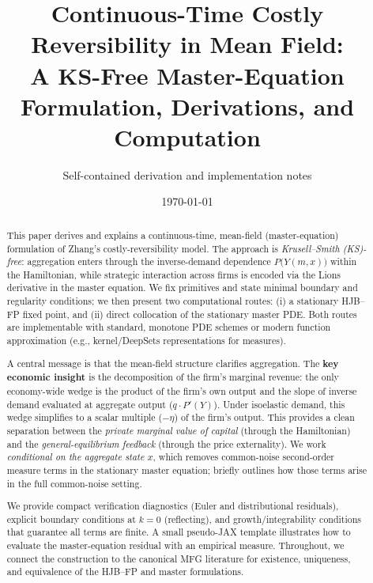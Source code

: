 ﻿\documentclass[11pt,letterpaper,oneside]{article}
\title{\vspace{-1.5em}Continuous-Time Costly Reversibility in Mean Field:\\
A KS-Free Master-Equation Formulation, Derivations, and Computation}
\author{%
\small Self-contained derivation and implementation notes
}
\date{\small \today}
\numberwithin{equation}{section}
\newcommand{\ac}[1]{{\mdseries\textsc{#1}}}
\newcommand{\1}{\mathbf{1}}
\begin{document}
\maketitle

\begin{abstract}
\noindent
This paper derives and explains a continuous-time, mean-field (master-equation) formulation of Zhang's costly-reversibility model. The approach is \emph{Krusell--Smith (KS)-free}: aggregation enters through the inverse-demand dependence $P\big(Y(m,x)\big)$ within the Hamiltonian, while strategic interaction across firms is encoded via the Lions derivative in the master equation. We fix primitives and state minimal boundary and regularity conditions; we then present two computational routes: (i) a stationary \ac{HJB}--\ac{FP} fixed point, and (ii) direct collocation of the stationary master \ac{PDE}. Both routes are implementable with standard, monotone PDE schemes or modern function approximation (e.g., kernel/DeepSets representations for measures).

A central message is that the mean-field structure clarifies aggregation. The \textbf{key economic insight} is the decomposition of the firm's marginal revenue: the only economy-wide wedge is the product of the firm's own output and the slope of inverse demand evaluated at aggregate output ($q\cdot P'(Y)$). Under isoelastic demand, this wedge simplifies to a scalar multiple ($-\eta$) of the firm's output. This provides a clean separation between the \emph{private marginal value of capital} (through the Hamiltonian) and the \emph{general-equilibrium feedback} (through the price externality). We work \emph{conditional on the aggregate state $x$}, which removes common-noise second-order measure terms in the stationary master equation;  briefly outlines how those terms arise in the full common-noise setting.

We provide compact verification diagnostics (Euler and distributional residuals), explicit boundary conditions at $k=0$ (reflecting), and growth/integrability conditions that guarantee all terms are finite. A small pseudo-JAX template illustrates how to evaluate the master-equation residual with an empirical measure. Throughout, we connect the construction to the canonical \ac{MFG} literature for existence, uniqueness, and equivalence of the \ac{HJB}--\ac{FP} and master formulations.
\end{abstract}

\tableofcontents
\end{document}
